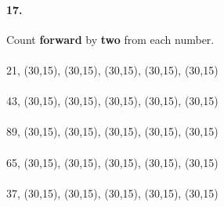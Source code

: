 \documentclass[12pt]{article}
\begin{document}
\paragraph{17.}
Count \textbf{forward} by \textbf{two} from each number. \\
\\
21, \framebox(30,15){}, \framebox(30,15){}, \framebox(30,15){}, \framebox(30,15){}, \framebox(30,15){}
\\
\\
43, \framebox(30,15){}, \framebox(30,15){}, \framebox(30,15){}, \framebox(30,15){}, \framebox(30,15){}
\\
\\
89, \framebox(30,15){}, \framebox(30,15){}, \framebox(30,15){}, \framebox(30,15){}, \framebox(30,15){}
\\
\\
65, \framebox(30,15){}, \framebox(30,15){}, \framebox(30,15){}, \framebox(30,15){}, \framebox(30,15){}
\\
\\
37, \framebox(30,15){}, \framebox(30,15){}, \framebox(30,15){}, \framebox(30,15){}, \framebox(30,15){}
\end{document}
